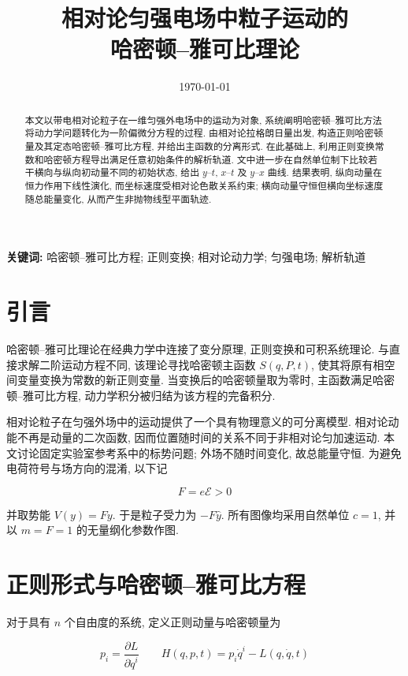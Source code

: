 \documentclass[UTF8, a4paper, 11pt]{ctexart}
\title{相对论匀强电场中粒子运动的\\哈密顿--雅可比理论}
\author{}
\date{\today}
\newcommand{\F}{F}
\newcommand{\Efield}{\mathcal{E}}
\begin{document}
\maketitle

\begin{abstract}
本文以带电相对论粒子在一维匀强外电场中的运动为对象, 系统阐明哈密顿--雅可比方法将动力学问题转化为一阶偏微分方程的过程. 由相对论拉格朗日量出发, 构造正则哈密顿量及其定态哈密顿--雅可比方程, 并给出主函数的分离形式. 在此基础上, 利用正则变换常数和哈密顿方程导出满足任意初始条件的解析轨道. 文中进一步在自然单位制下比较若干横向与纵向初动量不同的初始状态, 给出 $y$--$t$, $x$--$t$ 及 $y$--$x$ 曲线. 结果表明, 纵向动量在恒力作用下线性演化, 而坐标速度受相对论色散关系约束; 横向动量守恒但横向坐标速度随总能量变化, 从而产生非抛物线型平面轨迹.
\end{abstract}

\noindent\textbf{关键词:} 哈密顿--雅可比方程; 正则变换; 相对论动力学; 匀强电场; 解析轨道

\section{引言}

哈密顿--雅可比理论在经典力学中连接了变分原理, 正则变换和可积系统理论. 与直接求解二阶运动方程不同, 该理论寻找哈密顿主函数 $S(q,P,t)$, 使其将原有相空间变量变换为常数的新正则变量. 当变换后的哈密顿量取为零时, 主函数满足哈密顿--雅可比方程, 动力学积分被归结为该方程的完备积分.

相对论粒子在匀强外场中的运动提供了一个具有物理意义的可分离模型. 相对论动能不再是动量的二次函数, 因而位置随时间的关系不同于非相对论匀加速运动. 本文讨论固定实验室参考系中的标势问题; 外场不随时间变化, 故总能量守恒. 为避免电荷符号与场方向的混淆, 以下记

\begin{equation}
  \F=e\Efield>0
\end{equation}

并取势能 $V(y)=\F y$. 于是粒子受力为 $-\F\hat y$. 所有图像均采用自然单位 $c=1$, 并以 $m=\F=1$ 的无量纲化参数作图.

\section{正则形式与哈密顿--雅可比方程}

对于具有 $n$ 个自由度的系统, 定义正则动量与哈密顿量为

\begin{equation}
  p_i=\frac{\partial L}{\partial\dot q^i}
  \qquad
  H(q,p,t)=p_i\dot q^i-L(q,\dot q,t)
\end{equation}
\end{document}
